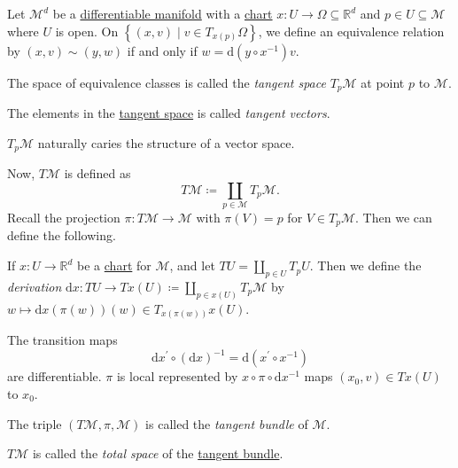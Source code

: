 \begin{definition*}
	Let \(\mathcal{M}^d \) be a \hyperref[def:smooth-manifold]{differentiable manifold} with a \hyperref[def:coordinate-chart]{chart} \(x\colon U \to \Omega \subseteq \mathbb{R} ^d\) and \(p\in U \subseteq \mathcal{M} \) where \(U\) is open. On \(\left\{ (x, v) \mid v\in T_{x(p)}\Omega \right\}\), we define an equivalence relation by \((x, v)\sim (y, w)\) if and only if \(w = \mathrm{d} (y \circ x ^{-1} )v\).

	\begin{definition}\label{def:tangent-space}
		The space of equivalence classes is called the \emph{tangent space} \(T_p \mathcal{M} \) at point \(p\) to \(\mathcal{M} \).
	\end{definition}
	\begin{definition}\label{def:tangent-vector}
		The elements in the \hyperref[def:tangent-space]{tangent space} is called \emph{tangent vectors}.
	\end{definition}
\end{definition*}

\begin{remark}
	\(T_p \mathcal{M} \) naturally caries the structure of a vector space.
\end{remark}

Now, \(T \mathcal{M} \) is defined as
\[
	T\mathcal{M} \coloneqq \coprod _{p\in \mathcal{M} }T_p \mathcal{M} .
\]
Recall the projection \(\pi \colon T\mathcal{M} \to  \mathcal{M} \) with \(\pi (V) = p\) for \(V\in T_p \mathcal{M} \). Then we can define the following.

\begin{definition}[Derivation]\label{def:derivation}
	If \(x\colon U \to  \mathbb{R} ^d\) be a \hyperref[def:coordinate-chart]{chart} for \(\mathcal{M} \), and let \(TU = \coprod_{p\in U} T_p U\). Then we define the \emph{derivation} \(\mathrm{d} x\colon TU \to  T x(U) \coloneqq \coprod_{p\in x(U)} T_p \mathcal{M} \) by \(w \mapsto \mathrm{d} x(\pi (w))(w)\in T_{x(\pi (w))} x(U)\).
\end{definition}

The transition maps
\[
	\mathrm{d} x^\prime \circ (\mathrm{d} x)^{-1}
	= \mathrm{d} (x^\prime \circ x ^{-1} )
\]
are differentiable. \(\pi \) is local represented by \(x \circ \pi \circ \mathrm{d} x ^{-1} \) maps \((x_0, v)\in Tx(U)\) to \(x_0\).

\begin{definition}\label{def:tangent-bundle}
	The triple \((T\mathcal{M} , \pi , \mathcal{M} )\) is called the \emph{tangent bundle} of \(\mathcal{M} \).

	\begin{definition}\label{def:tangent-bundle-total-space}
		\(T\mathcal{M} \) is called the \emph{total space} of the \hyperref[def:tangent-bundle]{tangent bundle}.
	\end{definition}
\end{definition}

